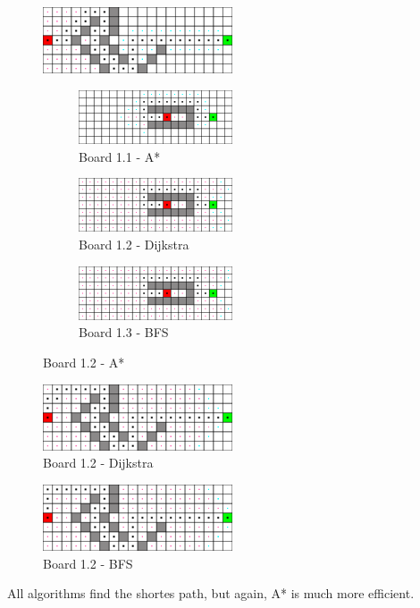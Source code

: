 \begin{figure}[h!]
  \centering
    \includegraphics[width=0.5\textwidth]{img/board-1-2-astar}\begin{figure}[h!]
  \centering
    \includegraphics[width=0.5\textwidth]{img/board-1-1-astar}
    \caption{Board 1.1 - A*}
\end{figure}

\begin{figure}[h!]
  \centering
    \includegraphics[width=0.5\textwidth]{img/board-1-1-dijkstra}
    \caption{Board 1.2 - Dijkstra}
\end{figure}

\begin{figure}[h!]
  \centering
    \includegraphics[width=0.5\textwidth]{img/board-1-1-bfs}
    \caption{Board 1.3 - BFS}
\end{figure}

    \caption{Board 1.2 - A*}
\end{figure}

\begin{figure}[h!]
  \centering
    \includegraphics[width=0.5\textwidth]{img/board-1-2-dijkstra}
    \caption{Board 1.2 - Dijkstra}
\end{figure}

\begin{figure}[h!]
  \centering
    \includegraphics[width=0.5\textwidth]{img/board-1-2-bfs}
    \caption{Board 1.2 - BFS}
\end{figure}

All algorithms find the shortes path, but again, A* is much more efficient.
